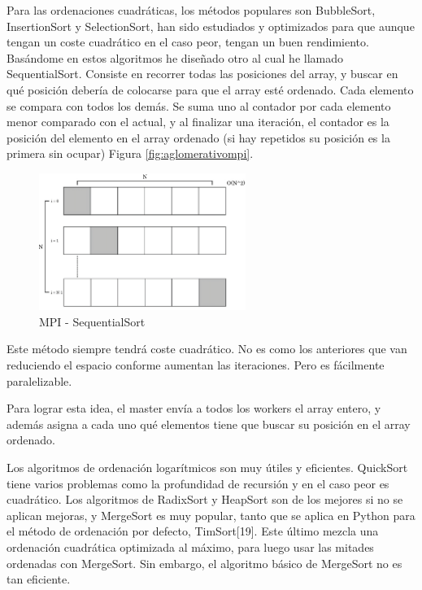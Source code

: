 Para las ordenaciones cuadráticas, los métodos populares son BubbleSort, InsertionSort y SelectionSort, han sido estudiados y optimizados para que aunque tengan un coste cuadrático en el caso peor, tengan un buen rendimiento. Basándome en estos algoritmos he diseñado otro al cual he llamado SequentialSort. Consiste en recorrer todas las posiciones del array, y buscar en qué posición debería de colocarse para que el array esté ordenado. Cada elemento se compara con todos los demás. Se suma uno al contador por cada elemento menor comparado con el actual, y al finalizar una iteración, el contador es la posición del elemento en el array ordenado (si hay repetidos su posición es la primera sin ocupar) Figura \ref{fig:aglomerativompi}.







\begin{figure}[!h]
	\centering
	\includegraphics[width=0.6\textwidth]{images/chapter_3/sequentialsort_mpi}
	\caption{MPI - SequentialSort}
	\label{fig:sequentialsortmpi}
\end{figure}

Este método siempre tendrá coste cuadrático. No es como los anteriores que van reduciendo el espacio conforme aumentan las iteraciones. Pero es fácilmente paralelizable. 

\newpage

Para lograr esta idea, el master envía a todos los workers el array entero, y además asigna a cada uno qué elementos tiene que buscar su posición en el array ordenado.



Los algoritmos de ordenación logarítmicos son muy útiles y eficientes. QuickSort tiene varios problemas como la profundidad de recursión y en el caso peor es cuadrático. Los algoritmos de RadixSort y HeapSort son de los mejores si no se aplican mejoras,  y MergeSort es muy popular, tanto que se aplica en Python para el método de ordenación por defecto, TimSort[19]. Este último mezcla una ordenación cuadrática optimizada al máximo, para luego usar las mitades ordenadas con MergeSort. Sin embargo, el algoritmo básico de MergeSort no es tan eficiente.

